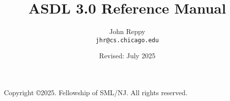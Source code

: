 \documentclass[11pt,letterpaper]{book}
\title{ASDL 3.0 Reference Manual}
\author{
  John Reppy\\
  \texttt{jhr@cs.chicago.edu}}
\date{Revised: July 2025}
\begin{document}
\frontmatter

\maketitle

\phantom{.}

\noindent Copyright \copyright{}2025.  Fellowship of SML/NJ.  All rights reserved.

\vskip 12pt

\pagebreak

\tableofcontents

\mainmatter


\newpage


%
%




%



\backmatter



\end{document}
